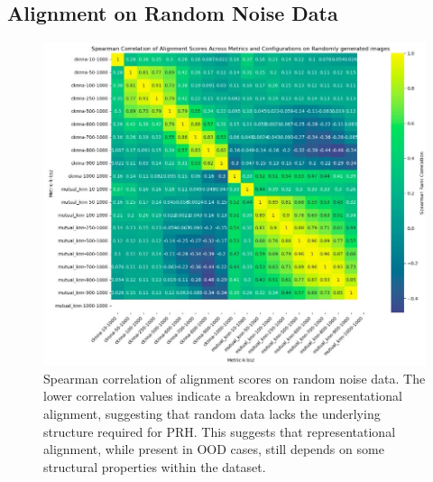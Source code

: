 \documentclass[10pt,a4paper]{article}
\begin{document}
\subsection{Alignment on Random Noise Data}
\begin{figure}[H]
    \centering
    \includegraphics[width=\textwidth]{prh_correlation_random.jpg}
    \caption{Spearman correlation of alignment scores on random noise data. The lower correlation values indicate a breakdown in representational alignment, suggesting that random data lacks the underlying structure required for PRH. This suggests that representational alignment, while present in OOD cases, still depends on some structural properties within the dataset.}
    \label{fig:prh_correlation_random}
\end{figure}
\end{document}
